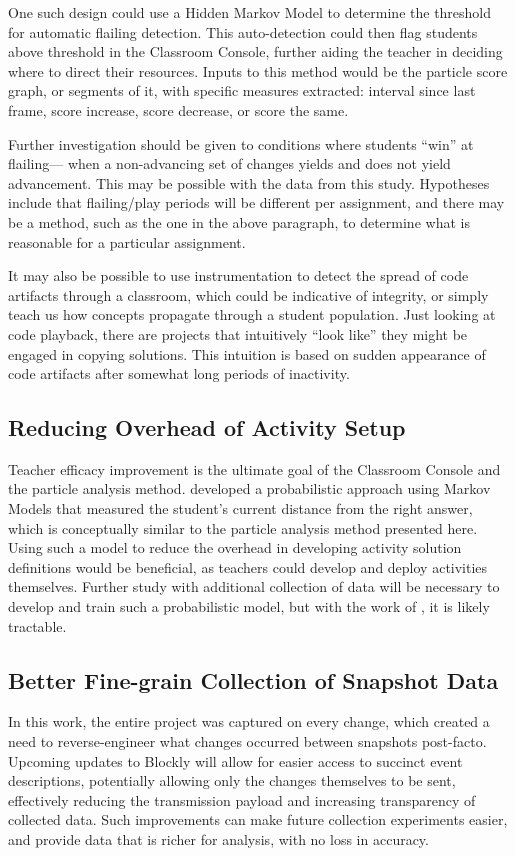 One such design could use a Hidden Markov Model to determine the threshold for automatic flailing detection. This auto-detection could then flag students above threshold in the Classroom Console, further aiding the teacher in deciding where to direct their resources. Inputs to this method would be the particle score graph, or segments of it, with specific measures extracted: interval since last frame, score increase, score decrease, or score the same. 

Further investigation should be given to conditions where students ``win'' at flailing--- when a non-advancing set of changes yields and does not yield advancement. This may be possible with the data from this study. Hypotheses include that flailing/play periods will be different per assignment, and there may be a method, such as the one in the above paragraph, to determine what is reasonable for a particular assignment. 

It may also be possible to use instrumentation to detect the spread of code artifacts through a classroom, which could be indicative of integrity, or simply teach us how concepts propagate through a student population. Just looking at code playback, there are projects that intuitively ``look like'' they might be engaged in copying solutions. This intuition is based on sudden appearance of code artifacts after somewhat long periods of inactivity. 

\subsection{Reducing Overhead of Activity Setup}
Teacher efficacy improvement is the ultimate goal of the Classroom Console and the particle analysis method. \citet{sudol2012calculating} developed a probabilistic approach using Markov Models that measured the student's current distance from the right answer, which is conceptually similar to the particle analysis method presented here. Using such a model to reduce the overhead in developing activity solution definitions would be beneficial, as teachers could develop and deploy activities themselves. Further study with additional collection of data will be necessary to develop and train such a probabilistic model, but with the work of \citet{sudol2012calculating}, it is likely tractable. 

\subsection{Better Fine-grain Collection of Snapshot Data} 
In this work, the entire project was captured on every change, which created a need to reverse-engineer what changes occurred between snapshots post-facto. Upcoming updates to Blockly will allow for easier access to succinct event descriptions, potentially allowing only the changes themselves to be sent, effectively reducing the transmission payload and increasing transparency of collected data. Such improvements can make future collection experiments easier, and provide data that is richer for analysis, with no loss in accuracy. 

